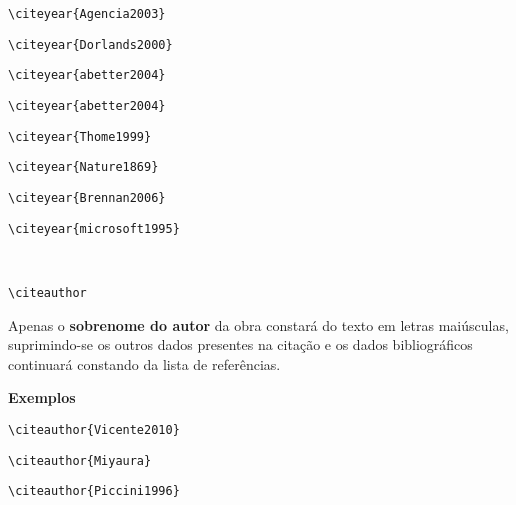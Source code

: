 \begin{alineas}
\begin{verbatim}
\citeyear{Agencia2003}
\end{verbatim}
\citeyear{Agencia2003}

\begin{verbatim}
\citeyear{Dorlands2000}
\end{verbatim}
\citeyear{Dorlands2000}

\begin{verbatim}
\citeyear{abetter2004}
\end{verbatim}
\citeyear{abetter2004}

\begin{verbatim}
\citeyear{abetter2004}
\end{verbatim}
\citeyear{council2001}

\begin{verbatim}
\citeyear{Thome1999}
\end{verbatim}
\citeyear{Thome1999}

\begin{verbatim}
\citeyear{Nature1869}
\end{verbatim}
\citeyear{Nature1869}

\begin{verbatim}
\citeyear{Brennan2006}
\end{verbatim}
\citeyear{Brennan2006}

\begin{verbatim}
\citeyear{microsoft1995}
\end{verbatim}
\citeyear{microsoft1995}\\

\item
\begin{verbatim}
\citeauthor
\end{verbatim}

Apenas o \textbf{sobrenome do autor} da obra constará do texto em letras maiúsculas, suprimindo-se os outros dados presentes na citação e os dados bibliográficos continuará constando da lista de referências. 

\textbf{Exemplos}

\begin{verbatim}
\citeauthor{Vicente2010}
\end{verbatim}
\citeauthor{Vicente2010}

\begin{verbatim}
\citeauthor{Miyaura}
\end{verbatim}
\citeauthor{Miyaura}

\begin{verbatim}
\citeauthor{Piccini1996} 
\end{verbatim}
\citeauthor{Piccini1996} 


\end{alineas}
